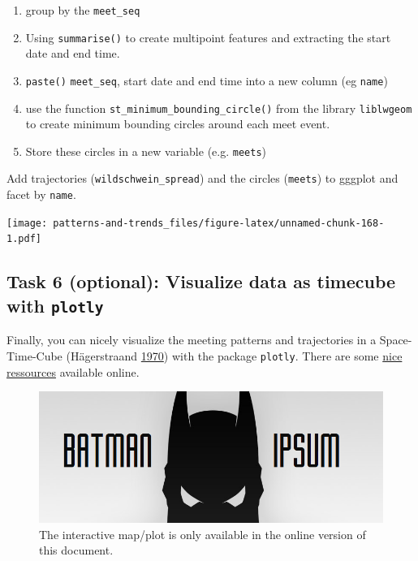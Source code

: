 \documentclass[]{book}
\providecommand{\tightlist}{%
  \setlength{\itemsep}{0pt}\setlength{\parskip}{0pt}}
\begin{document}
\begin{enumerate}
\def\labelenumi{\arabic{enumi}.}
\tightlist
\item
  group by the \texttt{meet\_seq}
\item
  Using \texttt{summarise()} to create multipoint features and
  extracting the start date and end time.
\item
  \texttt{paste()} \texttt{meet\_seq}, start date and end time into a
  new column (eg \texttt{name})
\item
  use the function \texttt{st\_minimum\_bounding\_circle()} from the
  library \texttt{liblwgeom} to create minimum bounding circles around
  each meet event.
\item
  Store these circles in a new variable (e.g. \texttt{meets})
\end{enumerate}

Add trajectories (\texttt{wildschwein\_spread}) and the circles
(\texttt{meets}) to gggplot and facet by \texttt{name}.

\texttt{[image: patterns-and-trends\_files/figure-latex/unnamed-chunk-168-1.pdf]}

\subsection{\texorpdfstring{Task 6 (optional): Visualize data as
timecube with
\texttt{plotly}}{Task 6 (optional): Visualize data as timecube with plotly}}\label{task-6-optional-visualize-data-as-timecube-with-plotly}

Finally, you can nicely visualize the meeting patterns and trajectories
in a Space-Time-Cube (Hägerstraand
\protect\hyperlink{ref-hagerstraand1970}{1970}) with the package
\texttt{plotly}. There are some
\href{https://plot.ly/r/3d-line-plots/}{nice ressources} available
online.

\begin{figure}
\centering
\includegraphics{02_Images/batman-ipsum.png}
\caption{The interactive map/plot is only available in the online
version of this document.}
\end{figure}
\end{document}
